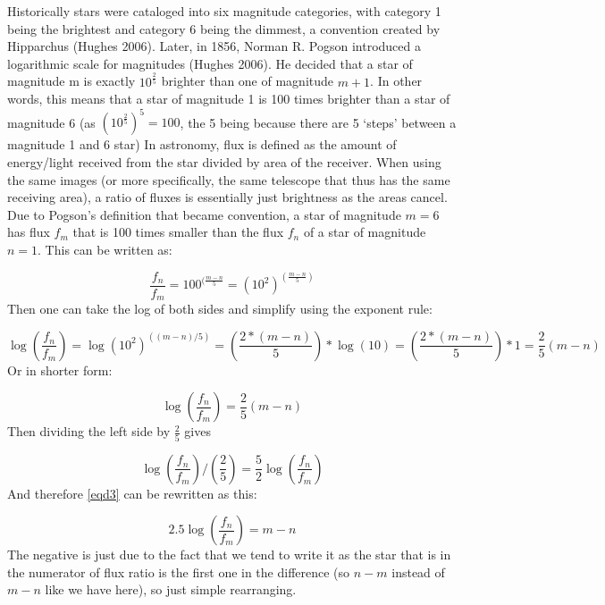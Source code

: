 \documentclass[linenumbers]{aastex631}
\begin{document}
\noindent
Historically stars were cataloged into six magnitude categories, with category 1 being the brightest and category 6 being the dimmest, a convention created by Hipparchus (Hughes 2006). Later, in 1856, Norman R. Pogson introduced a logarithmic scale for magnitudes (Hughes 2006). He decided that a star of magnitude m is exactly $10^{\frac 2 5}$ brighter than one of magnitude $m+1$. In other words, this means that a star of magnitude 1 is 100 times brighter than a star of magnitude 6 (as $(10^{\frac 2 5})^5 = 100$, the 5 being because there are 5 ‘steps’ between a magnitude 1 and 6 star)
\newline \newline
In astronomy, flux is defined as the amount of energy/light received from the star divided by area of the receiver. When using the same images (or more specifically, the same telescope that thus has the same receiving area), a ratio of fluxes is essentially just brightness as the areas cancel. 
\newline \newline
Due to Pogson’s definition that became convention, a star of magnitude $m=6$ has flux $f_m$ that is 100 times smaller than the flux $f_n$ of a star of magnitude $n=1$. This can be written as: 

\begin{equation}
    \frac{f_n}{f_m} = 100 ^ {(\frac{m-n}{5}} = (10^2 )^ {(\frac{m-n}{5})}
\end{equation}
Then one can take the log of both sides and simplify using the exponent rule: 

\begin{equation}
    \log(\frac {f_n} {f_m}) = \log(10^2) ^ {((m-n)/5)} = (\frac{2*(m-n)}5)*\log(10) = (\frac{2*(m-n)}5)*1= \frac 2 5 (m-n)
\end{equation}
Or in shorter form: 

\begin{equation} \label{eqd3}
    \log(\frac {f_n} {f_m}) = \frac 2 5 (m-n)
\end{equation}
Then dividing the left side by $\frac 2 5$ gives

\begin{equation}
    \log (\frac {f_n} {f_m}) / (\frac 2 5) = \frac 5 2 \log (\frac {f_n} {f_m})
\end{equation}
And therefore \ref{eqd3} can be rewritten as this:

\begin{equation}
    2.5 \log (\frac {f_n} {f_m}) = m-n
\end{equation}
The negative is just due to the fact that we tend to write it as the star that is in the numerator of flux ratio is the first one in the difference (so $n-m$ instead of $m-n$ like we have here), so just simple rearranging.
\end{document}
